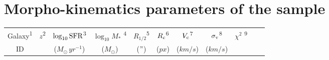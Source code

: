 \clearpage
\section{Morpho-kinematics parameters of the sample}

\begin{table}[htbp]

	\centering

	\begin{tabular}{c c c c c c c c c c c}

\hline
Galaxy\textsuperscript{1} & $z$\textsuperscript{2} & $\log_{10} \rm{SFR}$\textsuperscript{3} & $\log_{10} M_{*}$ \textsuperscript{4} & $R_{1/2}$\textsuperscript{5} & $R_{\rm{c}}$\textsuperscript{6} & $V_{\rm{c}}$\textsuperscript{7} & $\sigma_{\rm{v}}$\textsuperscript{8} & $\chi^2$ \textsuperscript{9} \\
ID & & ($\si{M_{\odot} \, yr^{-1}}$) & ($\si{M_{\odot}}$) & ($\si{"}$) & ($\si{px}$) & ($\si{km/s}$) & ($\si{km/s}$) & \\
\hline


\end{tabular}
\end{table}
